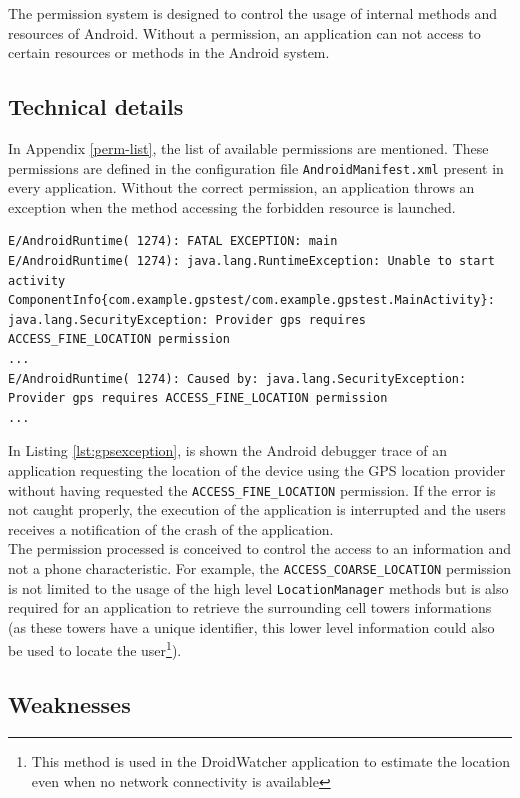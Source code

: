 The permission system is designed to control the usage of internal methods and resources of Android.
Without a permission, an application can not access to certain resources or methods in the Android system.

\subsection{Technical details}
In Appendix \ref{perm-list}, the list of available permissions are mentioned.
These permissions are defined in the configuration file \texttt{AndroidManifest.xml} present in every application.
Without the correct permission, an application throws an exception when the method accessing the forbidden resource is launched.

\begin{lstlisting}[breaklines,caption={Example of permission violation log},label={lst:gpsexception},numbers=none]
E/AndroidRuntime( 1274): FATAL EXCEPTION: main
E/AndroidRuntime( 1274): java.lang.RuntimeException: Unable to start activity ComponentInfo{com.example.gpstest/com.example.gpstest.MainActivity}: java.lang.SecurityException: Provider gps requires ACCESS_FINE_LOCATION permission
...
E/AndroidRuntime( 1274): Caused by: java.lang.SecurityException: Provider gps requires ACCESS_FINE_LOCATION permission
...
\end{lstlisting}

In Listing \ref{lst:gpsexception}, is shown the Android debugger trace of an application requesting the location of the device using the GPS location provider without having requested the \texttt{ACCESS\_FINE\_LOCATION} permission.
If the error is not caught properly, the execution of the application is interrupted and the users receives a notification of the crash of the application.\\

The permission processed is conceived to control the access to an information and not a phone characteristic.
For example, the \texttt{ACCESS\_COARSE\_LOCATION} permission is not limited to the usage of the high level \texttt{LocationManager} methods but is also required for an application to retrieve the surrounding cell towers informations (as these towers have a unique identifier, this lower level information could also be used to locate the user\footnote{This method is used in the DroidWatcher application to estimate the location even when no network connectivity is available}).

\subsection{Weaknesses}

